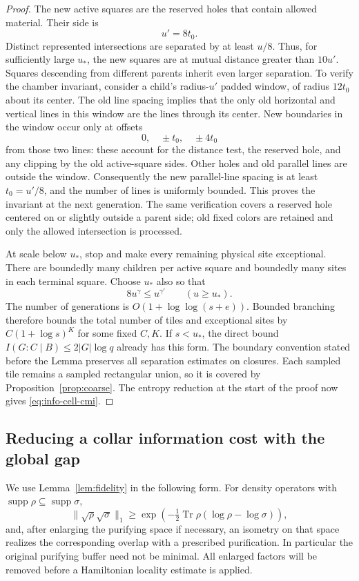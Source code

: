 \documentclass[11pt]{article}
\numberwithin{equation}{section}
\theoremstyle{definition}
\theoremstyle{remark}
\begin{document}
\begin{proof}
The new active squares are the reserved holes that contain allowed
material.  Their side is
\[
 u'=8t_0.
\]
Distinct represented intersections are separated by at least $u/8$.
Thus, for sufficiently large $u_*$, the new squares are at mutual
distance greater than $10u'$.  Squares descending from different
parents inherit even larger separation.  To verify the chamber
invariant, consider a child's radius-$u'$ padded window, of radius
$12t_0$ about its center.  The old line spacing implies that the only
old horizontal and vertical lines in this window are the lines through
its center.  New boundaries in the window occur only at offsets
\[
 0,\quad \pm t_0,\quad \pm4t_0
\]
from those two lines: these account for the distance test, the reserved
hole, and any clipping by the old active-square sides.  Other holes
and old parallel lines are outside the window.  Consequently the new
parallel-line spacing is at least $t_0=u'/8$, and the number of lines
is uniformly bounded.  This proves the invariant at the next generation.
The same verification covers a reserved hole centered on or slightly
outside a parent side; old fixed colors are retained and only the
allowed intersection is processed.

At scale below $u_*$, stop and make every remaining physical site
exceptional.  There are boundedly many children per active square and
boundedly many sites in each terminal square.  Choose $u_*$ also so that
\[
 8u^\gamma\le u^{\gamma'}\qquad(u\ge u_*).
\]
The number of generations is $O(1+\log\log(s+e))$.  Bounded branching
therefore bounds the total number of tiles and exceptional sites by
$C(1+\log s)^K$ for some fixed $C,K$.  If $s<u_*$, the direct bound
$I(G:C\mid B)\le2|G|\log q$ already has this form.  The boundary
convention stated before the Lemma preserves all separation estimates
on closures.  Each sampled tile remains a sampled rectangular union,
so it is covered by Proposition~\ref{prop:coarse}.  The entropy reduction
at the start of the proof now gives \eqref{eq:info-cell-cmi}.
\end{proof}

\subsection{Reducing a collar information cost with the global gap}

We use Lemma~\ref{lem:fidelity} in the following form.  For density
operators with $\operatorname{supp}\rho\subseteq\operatorname{supp}\sigma$,
\begin{equation}
 \lVert \sqrt\rho\sqrt\sigma\rVert_1
 \ge \exp\left(-\tfrac12\operatorname{Tr}\rho(\log\rho-\log\sigma)\right),
 \label{eq:info-relative-entropy-overlap}
\end{equation}
and, after enlarging the purifying space if necessary, an isometry on
that space realizes the corresponding overlap with a prescribed
purification.  In particular the original purifying buffer need not
be minimal.  All enlarged factors will be removed before a Hamiltonian
locality estimate is applied.
\end{document}
